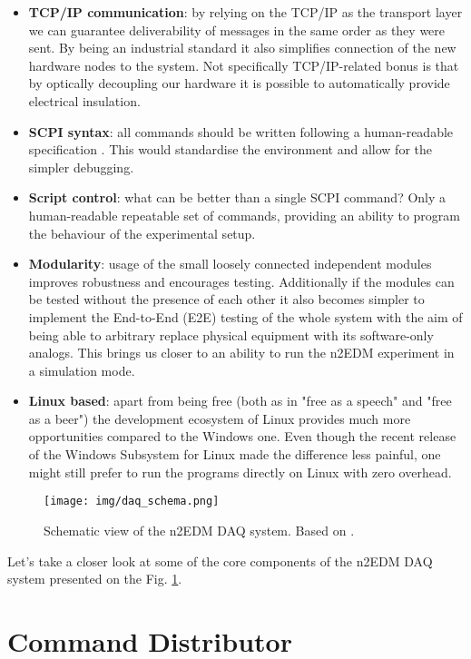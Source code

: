 \begin{itemize}
	\item \textbf{TCP/IP communication}: by relying on the TCP/IP as the transport layer we can guarantee deliverability of messages in the same order as they were sent. By being an industrial standard it also simplifies connection of the new hardware nodes to the system. Not specifically TCP/IP-related bonus is that by optically decoupling our hardware it is possible to automatically provide electrical insulation.
	\item \textbf{SCPI syntax}: all commands should be written following a human-readable specification \cite{SCPIConsortium1999}. This would standardise the environment and allow for the simpler debugging.
	\item \textbf{Script control}: what can be better than a single SCPI command? Only a human-readable repeatable set of commands, providing an ability to program the behaviour of the experimental setup.
	\item \textbf{Modularity}: usage of the small loosely connected independent modules improves robustness and encourages testing. Additionally if the modules can be tested without the presence of each other it also becomes simpler to implement the End-to-End (E2E) testing of the whole system with the aim of being able to arbitrary replace physical equipment with its software-only analogs. This brings us closer to an ability to run the n2EDM experiment in a simulation mode.
	\item \textbf{Linux based}: apart from being free (both as in "free as a speech" and "free as a beer") the development ecosystem of Linux provides much more opportunities compared to the Windows one. Even though the recent release \cite{Loewen2019} of the Windows Subsystem for Linux made the difference less painful, one might still prefer to run the programs directly on Linux with zero overhead.
\end{itemize}

\begin{figure}[h]
	\centering
	\texttt{[image: img/daq\_schema.png]}
	\caption{Schematic view of the n2EDM DAQ system. Based on \cite{Bison2018}.}
	\label{fig:daq_schema}
\end{figure}

Let's take a closer look at some of the core components of the n2EDM DAQ system presented on the Fig. \ref{fig:daq_schema}.

\section{Command Distributor}
\label{sec:distributor}

